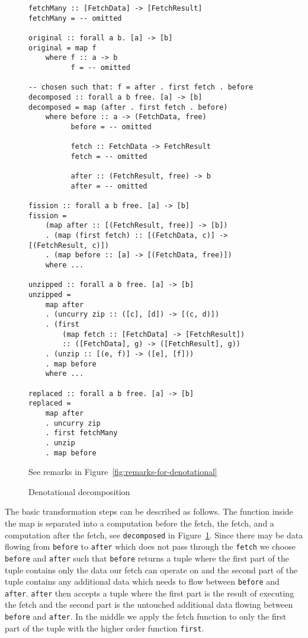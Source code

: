 \begin{figure}[h]
\begin{verbatim}
fetchMany :: [FetchData] -> [FetchResult]
fetchMany = -- omitted

original :: forall a b. [a] -> [b]
original = map f
    where f :: a -> b
          f = -- omitted

-- chosen such that: f = after . first fetch . before
decomposed :: forall a b free. [a] -> [b]
decomposed = map (after . first fetch . before)
    where before :: a -> (FetchData, free)
          before = -- omitted

          fetch :: FetchData -> FetchResult
          fetch = -- omitted

          after :: (FetchResult, free) -> b
          after = -- omitted

fission :: forall a b free. [a] -> [b]
fission =
    (map after :: [(FetchResult, free)] -> [b])
    . (map (first fetch) :: [(FetchData, c)] -> [(FetchResult, c)])
    . (map before :: [a] -> [(FetchData, free)])
    where ...

unzipped :: forall a b free. [a] -> [b]
unzipped =
    map after
    . (uncurry zip :: ([c], [d]) -> [(c, d)])
    . (first
        (map fetch :: [FetchData] -> [FetchResult])
        :: ([FetchData], g) -> ([FetchResult], g))
    . (unzip :: [(e, f)] -> ([e], [f]))
    . map before
    where ...

replaced :: forall a b free. [a] -> [b]
replaced =
    map after
    . uncurry zip
    . first fetchMany
    . unzip
    . map before
\end{verbatim}
See remarks in Figure~\ref{fig:remarks-for-denotational}
\caption{Denotational decomposition}
\label{fig:map-decomposition-in-code}

\end{figure}

The basic transformation steps can be described as follows.
The function inside the map is separated into a computation before the fetch, the fetch, and a computation after the fetch, see \texttt{decomposed} in Figure~\ref{fig:map-decomposition-in-code}.
Since there may be data flowing from \texttt{before} to \texttt{after} which does not pass through the \texttt{fetch} we choose \texttt{before} and \texttt{after} such that \texttt{before} returns a tuple where the first part of the tuple contains only the data our fetch can operate on and the second part of the tuple contains any additional data which needs to flow between \texttt{before} and \texttt{after}.
\texttt{after} then accepts a tuple where the first part is the result of executing the fetch and the second part is the untouched additional data flowing between \texttt{before} and \texttt{after}.
In the middle we apply the fetch function to only the first part of the tuple with the higher order function \texttt{first}.

